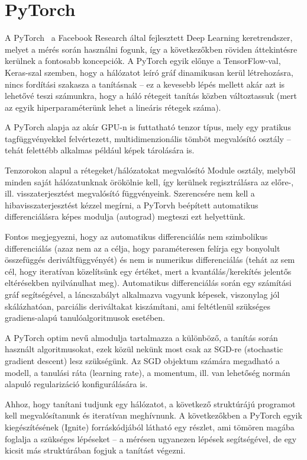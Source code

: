 \documentclass[12pt,a4paper,oneside]{report}             %
\begin{document}
\section{PyTorch}

A PyTorch~\cite{torchDoc,torchTut} a Facebook Research által fejlesztett Deep Learning keretrendszer, melyet a mérés során használni fogunk, így a következőkben röviden áttekintésre kerülnek a fontosabb koncepciók. A PyTorch egyik előnye a TensorFlow-val, Keras-szal szemben, hogy a hálózatot leíró gráf dinamikusan kerül létrehozásra, nincs fordítási szakasza a tanításnak – ez a kevesebb lépés mellett akár azt is lehetővé teszi számunkra, hogy a háló rétegeit tanítás közben változtassuk (mert az egyik hiperparaméterünk lehet a lineáris rétegek száma).

A PyTorch alapja az akár GPU-n is futtatható tenzor típus, mely egy pratikus tagfüggvényekkel felvértezett, multidimenzionális tömböt megvalósító osztály – tehát felettébb alkalmas például képek tárolására is.

Tenzorokon alapul a rétegeket/hálózatokat megvalósító Module osztály, melyből minden saját hálózatunknak örökölnie kell, így kerülnek regisztrálásra az előre-, ill. visszaterjesztést megvalósító függvényeink. Szerencsére nem kell a hibavisszaterjesztést kézzel megírni, a PyTorvh beépített automatikus differenciálásra képes modulja (autograd) megteszi ezt helyettünk.

Fontos megjegyezni, hogy az automatikus differenciálás nem szimbolikus differenciálás (azaz nem az a célja, hogy paraméteresen felírja egy bonyolult összefüggés deriváltfüggvényét) és nem is numerikus differenciálás (tehát az sem cél, hogy iteratívan közelítsünk egy értéket, mert a kvantálás/kerekítés jelentős eltérésekben nyilvánulhat meg). Automatikus differenciálás során egy számítási gráf segítségével, a láncszabályt alkalmazva vagyunk képesek, viszonylag jól skálázhatóan, parciális deriváltakat kiszámítani, ami feltétlenül szükséges gradiens-alapú tanulóalgoritmusok esetében.

A PyTorch optim nevű almodulja tartalmazza a különböző, a tanítás során használt algoritmusokat, ezek közül nekünk most csak az SGD-re (stochastic gradient descent) lesz szükségünk. Az SGD objektum számára megadható a modell, a tanulási ráta (learning rate), a momentum, ill. van lehetőség normán alapuló regularizáció konfigurálására is.

Ahhoz, hogy tanítani tudjunk egy hálózatot, a következő struktúrájú programot kell megvalósítanunk és iteratívan meghívnunk. A következőkben a PyTorch egyik kiegészítésének (Ignite) forráskódjából látható egy részlet, ami tömören magába foglalja a szükséges lépéseket – a mérésen ugyanezen lépések segítségével, de egy kicsit más struktúrában fogjuk a tanítást végezni.
\end{document}

